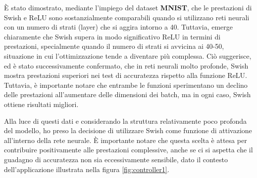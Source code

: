 È stato dimostrato, mediante l'impiego del dataset \textbf{MNIST}, 
che le prestazioni di Swish e ReLU sono sostanzialmente comparabili 
quando si utilizzano reti neurali con un numero di strati (layer) 
che si aggira intorno a 40. Tuttavia, emerge chiaramente che Swish 
supera in modo significativo ReLU in termini di prestazioni, 
specialmente quando il numero di strati si avvicina ai 40-50, 
situazione in cui l'ottimizzazione tende a diventare più complessa. 
Ciò suggerisce, ed è stato successivamente confermato, che in reti 
neurali molto profonde, Swish mostra prestazioni superiori nei test 
di accuratezza rispetto alla funzione ReLU. Tuttavia, è importante 
notare che entrambe le funzioni sperimentano un declino delle 
prestazioni all'aumentare delle dimensioni dei batch, ma in ogni caso, 
Swish ottiene risultati migliori.

Alla luce di questi dati e considerando la struttura relativamente 
poco profonda del modello, ho preso la decisione di utilizzare 
Swish come funzione di attivazione all'interno della rete neurale. 
È importante notare che questa scelta è attesa per contribuire 
positivamente alle prestazioni complessive, anche se ci si aspetta 
che il guadagno di accuratezza non sia eccessivamente sensibile, 
dato il contesto dell'applicazione illustrata nella figura 
\ref{fig:controller1}.